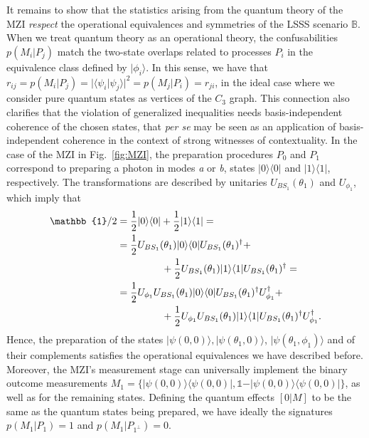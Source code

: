 \documentclass[a4paper,twocolumn,11pt,accepted=2024-01-17]{quantumarticle}
\begin{document}
It remains to show that the statistics arising from the quantum theory of the MZI \textit{respect} the operational equivalences and symmetries of the LSSS scenario $\mathbb{B}$. When we treat quantum theory as an operational theory, the confusabilities $p(M_i \vert P_j)$ match the two-state overlaps related to processes $P_i$ in the equivalence class defined by $\vert \phi_i \rangle$. In this sense, we have that $r_{ij} = p(M_i \vert P_j) = \vert \langle \psi_i \vert \psi_j \rangle \vert^2 = p(M_j \vert P_i) = r_{ji}$, in the ideal case where we consider pure quantum states as vertices of the $C_3$ graph. This connection also clarifies that the violation of generalized inequalities needs basis-independent coherence of the chosen states, that \emph{per se} may be seen as an application of basis-independent coherence in the context of strong witnesses of contextuality. In the case of the MZI in Fig.~\ref{fig:MZI}, the preparation procedures $P_0$ and $P_1$ correspond to {preparing} a photon in modes \textit{a} or \textit{b}, states $\vert 0 \rangle \langle 0 \vert$ and $\vert 1 \rangle \langle 1 \vert$, respectively. The transformations are described by unitaries $U_{BS_1}(\theta_1)$ and $U_{\phi_1}$, which imply that
\begin{align*}
    \mathbb{1}/2 &= \frac{1}{2}\vert 0 \rangle \langle 0 \vert + \frac{1}{2}\vert 1\rangle \langle 1 \vert =\\ &=\frac{1}{2}U_{BS_1}(\theta_1)\vert 0 \rangle \langle 0 \vert U_{BS_1}(\theta_1)^\dagger+\\ &\hspace{4.5em}+\frac{1}{2}U_{BS_1}(\theta_1)\vert 1\rangle \langle 1 \vert U_{BS_1}(\theta_1)^\dagger =\\ &=\frac{1}{2}U_{\phi_1}U_{BS_1}(\theta_1)\vert 0 \rangle \langle 0 \vert U_{BS_1}(\theta_1)^\dagger U_{\phi_1}^\dagger +\\
    &\hspace{4.5em}+\frac{1}{2}U_{\phi_1}U_{BS_1}(\theta_1)\vert 1\rangle \langle 1 \vert U_{BS_1}(\theta_1)^\dagger U_{\phi_1}^\dagger.
\end{align*}
Hence, the preparation of the states $\vert \psi(0,0) \rangle, \vert \psi(\theta_1,0) \rangle$, $\vert \psi(\theta_1,\phi_1) \rangle$ and of their complements satisfies the operational equivalences we have described before. Moreover, the MZI's measurement stage can universally implement the binary outcome measurements $M_1 = \{\vert \psi(0,0) \rangle \langle \psi(0,0) \vert, \mathbb{1} -\vert \psi(0,0) \rangle \langle \psi(0,0) \vert \}$, as well as for the remaining states. Defining the quantum effects {$[0 \vert M]$} to be the same as the quantum states being prepared, we have ideally the signatures $p(M_1\vert P_1) = 1$ and $p(M_1 \vert P_{1^\perp}) = 0$. 
\end{document}
